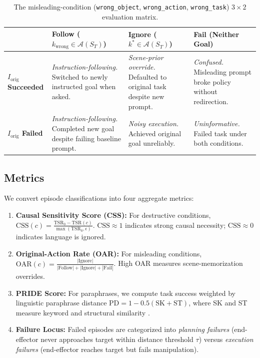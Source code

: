 \documentclass[11pt]{article}
\begin{document}
\begin{table}[t]
\centering
\small
\renewcommand{\arraystretch}{1.25}
    \begin{tabular}{@{}p{2.5cm}p{4.2cm}p{4.2cm}p{4.2cm}@{}}
        \hline
        & \textbf{Follow ($k_{\text{wrong}} \in \mathcal{A}(S_T)$)} & \textbf{Ignore ($k^* \in \mathcal{A}(S_T)$)} & \textbf{Fail (Neither Goal)} \\
        \hline
        \textbf{$I_{\text{orig}}$ Succeeded} & \emph{Instruction-following.} Switched to newly instructed goal when asked. & \emph{Scene-prior override.} Defaulted to original task despite new prompt. & \emph{Confused.} Misleading prompt broke policy without redirection. \\
        \textbf{$I_{\text{orig}}$ Failed} & \emph{Instruction-following.} Completed new goal despite failing baseline prompt. & \emph{Noisy execution.} Achieved original goal unreliably. & \emph{Uninformative.} Failed task under both conditions. \\
        \hline
    \end{tabular}
    \caption{The misleading-condition (\texttt{wrong\_object}, \texttt{wrong\_action}, \texttt{wrong\_task}) $3\times2$ evaluation matrix.}
    \label{tab:follow-ignore-fail}
\end{table}

\subsection{Metrics}
\label{subsec:metrics}

We convert episode classifications into four aggregate metrics:

\begin{enumerate}
    \item \textbf{Causal Sensitivity Score (CSS):} For destructive conditions, $\text{CSS}(c) = \frac{\text{TSR}_0 - \text{TSR}(c)}{\max(\text{TSR}_0, \epsilon)}$. $\text{CSS} \approx 1$ indicates strong causal necessity; $\text{CSS} \approx 0$ indicates language is ignored.
    \item \textbf{Original-Action Rate (OAR):} For misleading conditions, $\text{OAR}(c) = \frac{|\text{Ignore}|}{|\text{Follow}| + |\text{Ignore}| + |\text{Fail}|}$. High OAR measures scene-memorization overrides.
    \item \textbf{PRIDE Score:} For paraphrases, we compute task success weighted by linguistic paraphrase distance $\text{PD} = 1 - 0.5(\text{SK} + \text{ST})$, where SK and ST measure keyword and structural similarity \citep{kim2026liberopara}.
    \item \textbf{Failure Locus:} Failed episodes are categorized into \emph{planning failures} (end-effector never approaches target within distance threshold $\tau$) versus \emph{execution failures} (end-effector reaches target but fails manipulation).
\end{enumerate}
\end{document}
